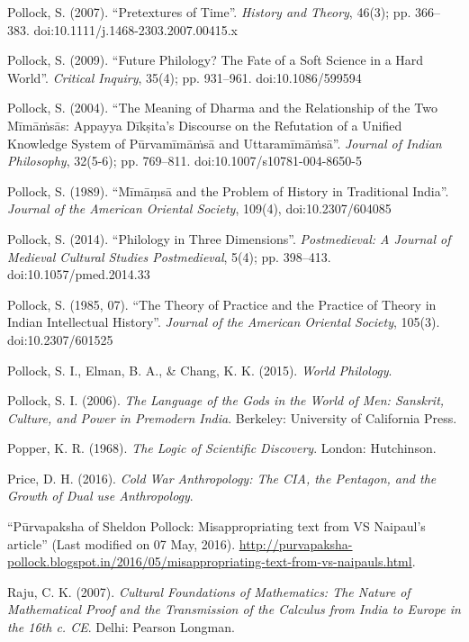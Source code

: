 \begin{thebibliography}{99}
Pollock, S. (2007). ``Pretextures of Time''. {\sl History and Theory}, 46(3); pp. 366--383. doi:10.1111/j.1468-2303.2007.00415.x

Pollock, S. (2009). ``Future Philology? The Fate of a Soft Science in a Hard World''. {\sl Critical Inquiry}, 35(4); pp. 931--961. doi:10.1086/599594

Pollock, S. (2004). ``The Meaning of Dharma and the Relationship of the Two Mīmāṁsās: Appayya Dīkṣita's Discourse on the Refutation of a Unified Knowledge System of Pūrvamīmāṁsā and Uttaramīmāṁsā''. {\sl Journal of Indian Philosophy}, 32(5-6); pp. 769--811. doi:10.1007/s10781-004-8650-5

Pollock, S. (1989). ``Mīmāṃsā and the Problem of History in Traditional India''. {\sl Journal of the American Oriental Society}, 109(4), doi:10.2307/604085

Pollock, S. (2014). ``Philology in Three Dimensions''. {\sl Postmedieval: A Journal of Medieval Cultural Studies Postmedieval}, 5(4); pp. 398--413. doi:10.1057/pmed.2014.33

Pollock, S. (1985, 07). ``The Theory of Practice and the Practice of Theory in Indian Intellectual History''. {\sl Journal of the American Oriental Society}, 105(3). doi:10.2307/601525

Pollock, S. I., Elman, B. A., \& Chang, K. K. (2015). {\sl World Philology}. 

Pollock, S. I. (2006). {\sl The Language of the Gods in the World of Men: Sanskrit, Culture, and Power in Premodern India}. Berkeley: University of California Press.

Popper, K. R. (1968). {\sl The Logic of Scientific Discovery}. London: Hutchinson.

Price, D. H. (2016). {\sl Cold War Anthropology: The CIA, the Pentagon, and the Growth of Dual use Anthropology}.

``Pūrvapaksha of Sheldon Pollock: Misappropriating text from VS Naipaul's article'' (Last modified on 07 May, 2016). \url{http://purvapaksha-pollock.blogspot.in/2016/05/misappropriating-text-from-vs-naipauls.html}. 

Raju, C. K. (2007). {\sl Cultural Foundations of Mathematics: The Nature of Mathematical Proof and the Transmission of the Calculus from India to Europe in the 16th c. CE}. Delhi: Pearson Longman.


\end{thebibliography}
